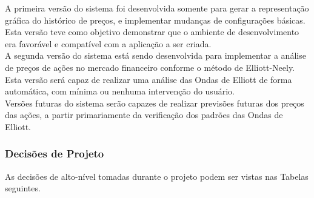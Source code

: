 \documentclass[12pt]{article}
\begin{document}
A primeira versão do sistema foi desenvolvida somente para gerar a representação gráfica
do histórico de preços, e implementar mudanças de configurações básicas. Esta versão teve
como objetivo demonstrar que o ambiente de desenvolvimento era favorável e compatível
com a aplicação a ser criada.\\

A segunda versão do sistema está sendo desenvolvida para implementar a análise de preços
de ações no mercado financeiro conforme o método de Elliott-Neely. Esta versão será capaz
de realizar uma análise das Ondas de Elliott de forma automática, com mínima ou nenhuma
intervenção do usuário.\\

Versões futuras do sistema serão capazes de realizar previsões futuras dos preços das ações,
a partir primariamente da verificação dos padrões das Ondas de Elliott.

\subsubsection{Decisões de Projeto}

As decisões de alto-nível tomadas durante o projeto podem ser vistas nas Tabelas seguintes.
\end{document}
